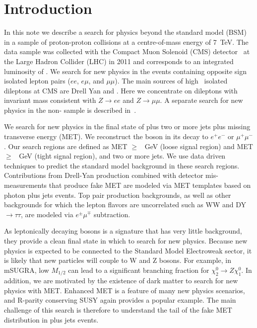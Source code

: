 
\section{Introduction}

In this note we describe a search for physics beyond the standard model (BSM) 
in a sample of proton-proton collisions at a centre-of-mass energy of 7~TeV. 
The data sample was collected with the Compact Muon Solenoid (CMS) detector~\cite{JINST} at 
the Large Hadron Collider (LHC) in 2011
and corresponds to an integrated luminosity of \lumi.
We search for new physics in the events containing
opposite sign isolated lepton pairs ($ee$, $e\mu$, and $\mu\mu$).
The main sources of high \pt\ isolated dileptons at CMS are Drell Yan and \ttbar.
Here we concentrate on dileptons with invariant mass consistent
with $Z \to ee$ and $Z \to \mu\mu$.  A separate search for new physics in the non-\Z
sample is described in~\cite{ref:ospaper}.

We search for new physics in the final state of \Z plus two or more jets plus missing 
transverse energy (MET). We reconstruct the \Z boson
in its decay to $e^+e^-$ or $\mu^+\mu^-$. Our search regions are defined as 
MET $\ge$ \signalmetl~GeV (loose signal region) and MET $\ge$ \signalmett~GeV 
(tight signal region), and two or more jets. We use data driven techniques to predict the
standard model background in these search regions. 
Contributions from Drell-Yan production combined with detector mis-measurements that 
produce fake MET are modeled via MET templates based on photon plus jets events. 
Top pair production backgrounds, as well as other backgrounds for which the lepton
flavors are uncorrelated such as WW and DY$\rightarrow\tau\tau$, are 
modeled via $e^\pm\mu^\mp$ subtraction.

As leptonically decaying \Z bosons is a signature that has very little background, 
they provide a clean final state in which to search for new physics. 
Because new physics is expected to be connected to the Standard Model Electroweak sector, 
it is likely that new particles will couple to W and Z bosons. 
For example, in mSUGRA, low $M_{1/2}$ can lead to a significant branching fraction 
for $\chi_2^0 \rightarrow Z \chi_1^0$. 
In addition, we are motivated by the existence of dark matter to search for new physics with MET.
Enhanced MET is a feature of many new physics scenarios, and R-parity conserving SUSY 
again provides a popular example. The main challenge of this search is therefore to 
understand the tail of the fake MET distribution in \Z plus jets events.

